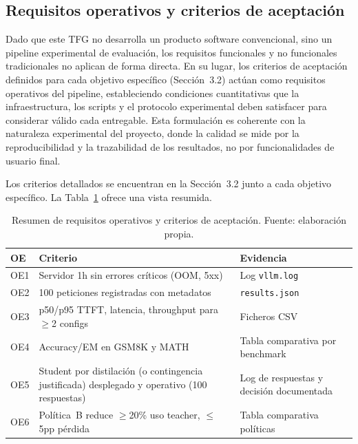 \documentclass[11pt,a4paper]{article}
\begin{document}
\subsection{Requisitos operativos y criterios de aceptación}

Dado que este TFG no desarrolla un producto software convencional, sino un pipeline experimental de evaluación, los requisitos funcionales y no funcionales tradicionales no aplican de forma directa. En su lugar, los criterios de aceptación definidos para cada objetivo específico (Sección~3.2) actúan como requisitos operativos del pipeline, estableciendo condiciones cuantitativas que la infraestructura, los scripts y el protocolo experimental deben satisfacer para considerar válido cada entregable. Esta formulación es coherente con la naturaleza experimental del proyecto, donde la calidad se mide por la reproducibilidad y la trazabilidad de los resultados, no por funcionalidades de usuario final.

Los criterios detallados se encuentran en la Sección~3.2 junto a cada objetivo específico. La Tabla~\ref{tab:acceptance} ofrece una vista resumida.

\begin{table}[H]
\centering
\caption{Resumen de requisitos operativos y criterios de aceptación. Fuente: elaboración propia.}
\label{tab:acceptance}
\footnotesize
\setlength{\tabcolsep}{4pt}
\begin{tabularx}{\textwidth}{>{\raggedright\arraybackslash}p{1cm} X >{\raggedright\arraybackslash}p{4.5cm}}
\toprule
\textbf{OE} & \textbf{Criterio} & \textbf{Evidencia} \\
\midrule
OE1 & Servidor 1h sin errores críticos (OOM, 5xx) & Log \texttt{vllm.log} \\
OE2 & 100 peticiones registradas con metadatos & \texttt{results.json} \\
OE3 & p50/p95 TTFT, latencia, throughput para $\geq$2 configs & Ficheros CSV \\
OE4 & Accuracy/EM en GSM8K y MATH & Tabla comparativa por benchmark \\
OE5 & Student por distilación (o contingencia justificada) desplegado y operativo (100 respuestas) & Log de respuestas y decisión documentada \\
OE6 & Política~B reduce $\geq$20\% uso teacher, $\leq$5pp pérdida & Tabla comparativa políticas \\
\bottomrule
\end{tabularx}
\end{table}
\end{document}
